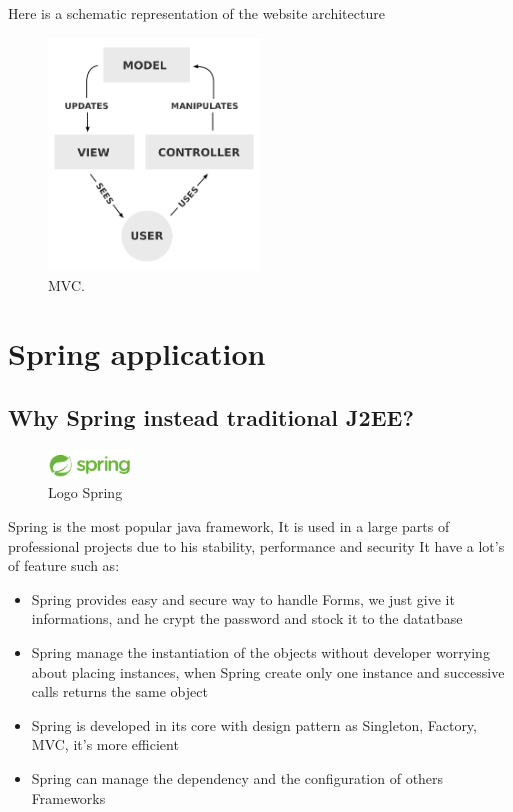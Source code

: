 Here is a schematic representation of the website architecture

\begin{figure}[!ht]
  \caption{MVC.}
  \centering
    \includegraphics[width=0.5\textwidth]{img/mvc.png}
\end{figure}

\newpage

\section{Spring application}
\subsection{Why Spring instead traditional J2EE?}

\begin{figure}[H]
  \caption{Logo Spring}
  \centering
    \includegraphics[width=0.2\textwidth]{img/spring.png}
\end{figure}


Spring is the most popular java framework, It is used in a large parts of professional projects due to his stability, performance and security
It have a lot's of feature such as:

\begin{itemize}  
\item Spring provides easy and secure way to handle Forms, we just give it informations, and he crypt the password and stock it to the datatbase
\item Spring manage the instantiation of the objects without developer worrying about placing instances, when Spring create only one instance and successive calls returns the same object
\item Spring is developed in its core with design pattern as Singleton, Factory, MVC, it's more efficient
\item Spring can manage the dependency and the configuration of others Frameworks
\end{itemize}  




